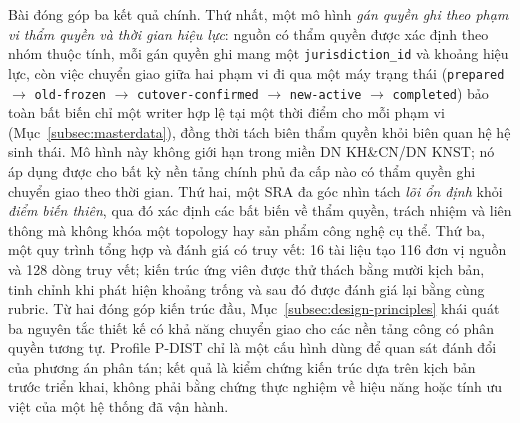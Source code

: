 Bài đóng góp ba kết quả chính. Thứ nhất, một mô hình \emph{gán quyền ghi theo phạm vi thẩm quyền và thời gian hiệu lực}: nguồn có thẩm quyền được xác định theo nhóm thuộc tính, mỗi gán quyền ghi mang một \texttt{jurisdiction\_id} và khoảng hiệu lực, còn việc chuyển giao giữa hai phạm vi đi qua một máy trạng thái (\texttt{prepared} $\rightarrow$ \texttt{old-frozen} $\rightarrow$ \texttt{cutover-confirmed} $\rightarrow$ \texttt{new-active} $\rightarrow$ \texttt{completed}) bảo toàn bất biến chỉ một writer hợp lệ tại một thời điểm cho mỗi phạm vi (Mục~\ref{subsec:masterdata}), đồng thời tách biên thẩm quyền khỏi biên quan hệ hệ sinh thái. Mô hình này không giới hạn trong miền DN KH\&CN/DN KNST; nó áp dụng được cho bất kỳ nền tảng chính phủ đa cấp nào có thẩm quyền ghi chuyển giao theo thời gian. Thứ hai, một SRA đa góc nhìn tách \emph{lõi ổn định} khỏi \emph{điểm biến thiên}, qua đó xác định các bất biến về thẩm quyền, trách nhiệm và liên thông mà không khóa một topology hay sản phẩm công nghệ cụ thể. Thứ ba, một quy trình tổng hợp và đánh giá có truy vết: 16 tài liệu tạo 116 đơn vị nguồn và 128 dòng truy vết; kiến trúc ứng viên được thử thách bằng mười kịch bản, tinh chỉnh khi phát hiện khoảng trống và sau đó được đánh giá lại bằng cùng rubric. Từ hai đóng góp kiến trúc đầu, Mục~\ref{subsec:design-principles} khái quát ba nguyên tắc thiết kế có khả năng chuyển giao cho các nền tảng công có phân quyền tương tự. Profile P-DIST chỉ là một cấu hình dùng để quan sát đánh đổi của phương án phân tán; kết quả là kiểm chứng kiến trúc dựa trên kịch bản trước triển khai, không phải bằng chứng thực nghiệm về hiệu năng hoặc tính ưu việt của một hệ thống đã vận hành.
